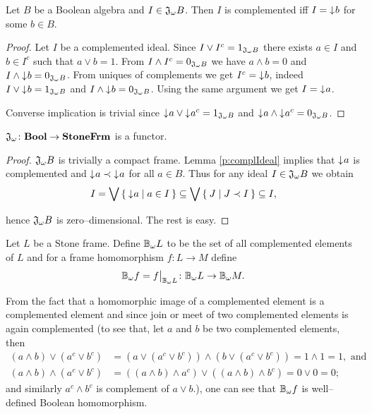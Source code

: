 \begin{lemma}\label{p:complIdeal}
    Let $B$ be a Boolean algebra and $I \in \mathfrak{J}_{\omega} B$. Then $I$ is complemented iff $I = \mathord{\downarrow}\mkern1mu b$ for some $b \in B$.
\end{lemma}
\begin{proof}
    Let $I$ be a complemented ideal. Since $I \vee I^c = 1_{\mathfrak{J}_{\omega} B}$ there exists $a \in I$ and $b \in I^c$ such that $a \vee b = 1$. From $I \wedge I^c = 0_{\mathfrak{J}_{\omega} B}$ we have $a \wedge b = 0$ and $I \wedge \mathord{\downarrow}\mkern1mu b = 0_{\mathfrak{J}_{\omega} B}$.
    From uniques of complements we get $I^c = \mathord{\downarrow}\mkern1mu b$, indeed $I \vee \mathord{\downarrow}\mkern1mu b = 1_{\mathfrak{J}_{\omega} B}$ and $I \wedge \mathord{\downarrow}\mkern1mu b = 0_{\mathfrak{J}_{\omega} B}$. Using the same argument we get $I = \mathord{\downarrow}\mkern1mu a$.

    Converse implication is trivial since $\mathord{\downarrow}\mkern1mu a \vee \mathord{\downarrow}\mkern1mu a^c = 1_{\mathfrak{J}_{\omega} B}$ and $\mathord{\downarrow}\mkern1mu a \wedge \mathord{\downarrow}\mkern1mu a^c = 0_{\mathfrak{J}_{\omega} B}$.
\end{proof}

\begin{proposition}\label{p:JisFunctor}
    $\mathfrak{J}_{\omega}\colon \mathbf{Bool} \to \mathbf{StoneFrm}$ is a functor.
\end{proposition}
\begin{proof}
    $\mathfrak{J}_{\omega} B$ is trivially a compact frame. Lemma \ref{p:complIdeal} implies that $\mathord{\downarrow}\mkern1mu a$ is complemented and $\mathord{\downarrow}\mkern1mu a \prec \mathord{\downarrow}\mkern1mu a$ for all $a \in B$. Thus for any ideal $I \in \mathfrak{J}_{\omega} B$ we obtain
    $$ I = \bigvee \Set{ \mathord{\downarrow}\mkern1mua | a \in I } \subseteq \bigvee \Set{ J | J \prec I } \subseteq I,$$

\noindent hence $\mathfrak{J}_{\omega} B$ is zero--dimensional. The rest is easy.
\end{proof}

\begin{definition}
    Let $L$ be a Stone frame. Define $\DEFSYM{BcO}{$\BcO{}$} L$ to be the set of all complemented elements of $L$ and for a frame homomorphism $f\colon L \to M$ define
    $$\BcO f = \restr{f}{\BcO L}\colon \BcO L \to \BcO M.$$
\end{definition}

From the fact that a homomorphic image of a complemented element is a complemented element and since join or meet of two complemented elements is again complemented (to see that, let $a$ and $b$ be two complemented elements, then
    \begin{align*}
        (a\wedge b) \vee (a^c \vee b^c)
            &= (a\vee (a^c\vee b^c))\wedge (b\vee (a^c\vee b^c))
            = 1 \wedge 1 = 1, \text{ and} \\
        (a\wedge b) \wedge (a^c \vee b^c)
            &= ((a\wedge b)\wedge a^c)\vee ((a\wedge b)\wedge b^c)
            = 0 \vee 0 = 0;
    \end{align*}
and similarly $a^c\wedge b^c$ is complement of $a\vee b$.), one can see that $\mathbb{B}_{\omega} f$ is well--defined Boolean homomorphism.


